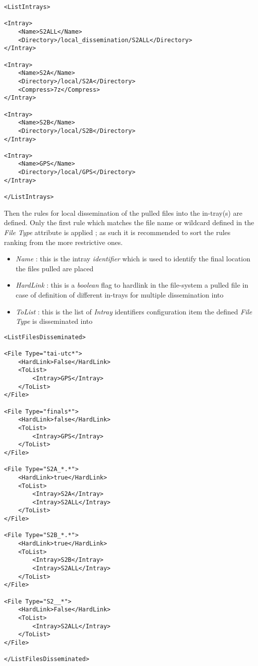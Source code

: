 \documentclass[dec_sum_main.tex]{subfiles}
\begin{document}
\begin{lstlisting}
<ListIntrays>

<Intray>
	<Name>S2ALL</Name>
	<Directory>/local_dissemination/S2ALL</Directory>
</Intray>

<Intray>
	<Name>S2A</Name>
	<Directory>/local/S2A</Directory>
	<Compress>7z</Compress>
</Intray>

<Intray>
	<Name>S2B</Name>
	<Directory>/local/S2B</Directory>
</Intray>

<Intray>
	<Name>GPS</Name>
	<Directory>/local/GPS</Directory>
</Intray>

</ListIntrays>

\end{lstlisting}

\par
\noindent
Then the rules for local dissemination of the pulled files into the in-tray(s) are defined. Only the first rule which matches the file name or wildcard defined in the \textit{File Type} attribute is applied ; as such it is recommended to sort the rules ranking from the more restrictive ones.  
\par
\noindent
\begin{itemize}
	\item \textit{Name} : this is the intray \textit{identifier} which is used to identify the final location the files pulled are placed
	\item \textit{HardLink} : this is a \textit{boolean} flag to hardlink in the file-system a pulled file in case of definition of different in-trays for multiple dissemination into
	\item \textit{ToList} : this is the list of \textit{Intray} identifiers configuration item the defined \textit{File Type} is disseminated into 
\end{itemize}
\begin{lstlisting}
<ListFilesDisseminated>

<File Type="tai-utc*">
	<HardLink>False</HardLink>
	<ToList>
		<Intray>GPS</Intray>
	</ToList>
</File>

<File Type="finals*">
	<HardLink>false</HardLink>
	<ToList>
		<Intray>GPS</Intray>
	</ToList>
</File>

<File Type="S2A_*.*">
	<HardLink>true</HardLink>
	<ToList>
		<Intray>S2A</Intray>
		<Intray>S2ALL</Intray>
	</ToList>
</File>

<File Type="S2B_*.*">
	<HardLink>true</HardLink>
	<ToList>
		<Intray>S2B</Intray>
		<Intray>S2ALL</Intray>
	</ToList>
</File>

<File Type="S2__*">
	<HardLink>False</HardLink>
	<ToList>
		<Intray>S2ALL</Intray>
	</ToList>
</File>

</ListFilesDisseminated>

\end{lstlisting}
	
\end{document}
